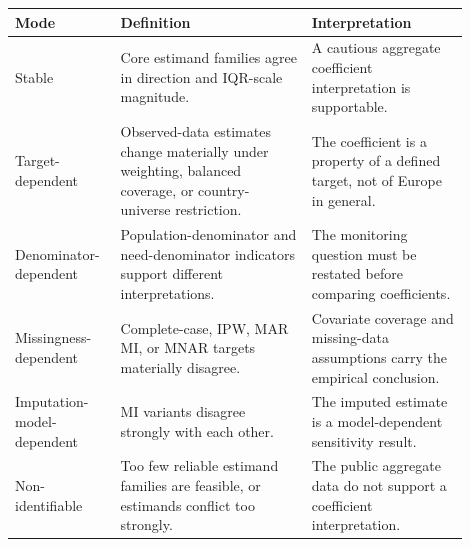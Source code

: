 \begin{tabular}{p{0.19\linewidth}p{0.39\linewidth}p{0.32\linewidth}}
\toprule
Mode & Definition & Interpretation \\
\midrule
Stable & Core estimand families agree in direction and IQR-scale magnitude. & A cautious aggregate coefficient interpretation is supportable. \\
Target-dependent & Observed-data estimates change materially under weighting, balanced coverage, or country-universe restriction. & The coefficient is a property of a defined target, not of Europe in general. \\
Denominator-dependent & Population-denominator and need-denominator indicators support different interpretations. & The monitoring question must be restated before comparing coefficients. \\
Missingness-dependent & Complete-case, IPW, MAR MI, or MNAR targets materially disagree. & Covariate coverage and missing-data assumptions carry the empirical conclusion. \\
Imputation-model-dependent & MI variants disagree strongly with each other. & The imputed estimate is a model-dependent sensitivity result. \\
Non-identifiable & Too few reliable estimand families are feasible, or estimands conflict too strongly. & The public aggregate data do not support a coefficient interpretation. \\
\bottomrule
\end{tabular}
